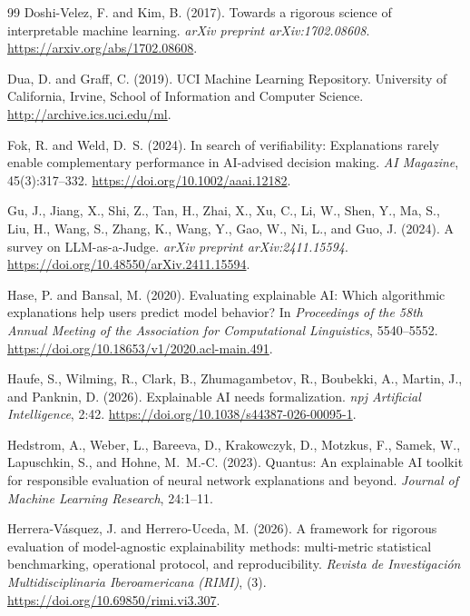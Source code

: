 \documentclass[fleqn,10pt,lineno]{wlpeerj}
\begin{document}
\begin{thebibliography}{99}
Doshi-Velez, F. and Kim, B. (2017).
Towards a rigorous science of interpretable machine learning.
\emph{arXiv preprint arXiv:1702.08608}.
\url{https://arxiv.org/abs/1702.08608}.

Dua, D. and Graff, C. (2019).
{UCI} Machine Learning Repository.
University of California, Irvine, School of Information and Computer Science.
\url{http://archive.ics.uci.edu/ml}.

Fok, R. and Weld, D.~S. (2024).
In search of verifiability: Explanations rarely enable complementary
performance in AI-advised decision making.
\emph{AI Magazine}, 45(3):317--332.
\url{https://doi.org/10.1002/aaai.12182}.

Gu, J., Jiang, X., Shi, Z., Tan, H., Zhai, X., Xu, C., Li, W., Shen, Y.,
Ma, S., Liu, H., Wang, S., Zhang, K., Wang, Y., Gao, W., Ni, L., and
Guo, J. (2024).
A survey on LLM-as-a-Judge.
\emph{arXiv preprint arXiv:2411.15594}.
\url{https://doi.org/10.48550/arXiv.2411.15594}.

Hase, P. and Bansal, M. (2020).
Evaluating explainable {AI}: Which algorithmic explanations help users
predict model behavior?
In \emph{Proceedings of the 58th Annual Meeting of the Association for
Computational Linguistics}, 5540--5552.
\url{https://doi.org/10.18653/v1/2020.acl-main.491}.

Haufe, S., Wilming, R., Clark, B., Zhumagambetov, R., Boubekki, A.,
Martin, J., and Panknin, D. (2026).
Explainable {AI} needs formalization.
\emph{npj Artificial Intelligence}, 2:42.
\url{https://doi.org/10.1038/s44387-026-00095-1}.

Hedstrom, A., Weber, L., Bareeva, D., Krakowczyk, D., Motzkus, F.,
Samek, W., Lapuschkin, S., and Hohne, M.~M.-C. (2023).
Quantus: An explainable AI toolkit for responsible evaluation of neural
network explanations and beyond.
\emph{Journal of Machine Learning Research}, 24:1--11.

Herrera-V\'asquez, J. and Herrero-Uceda, M. (2026).
A framework for rigorous evaluation of model-agnostic explainability
methods: multi-metric statistical benchmarking, operational protocol, and
reproducibility.
\emph{Revista de Investigaci\'on Multidisciplinaria Iberoamericana (RIMI)},
(3).
\url{https://doi.org/10.69850/rimi.vi3.307}.


\end{thebibliography}
\end{document}
